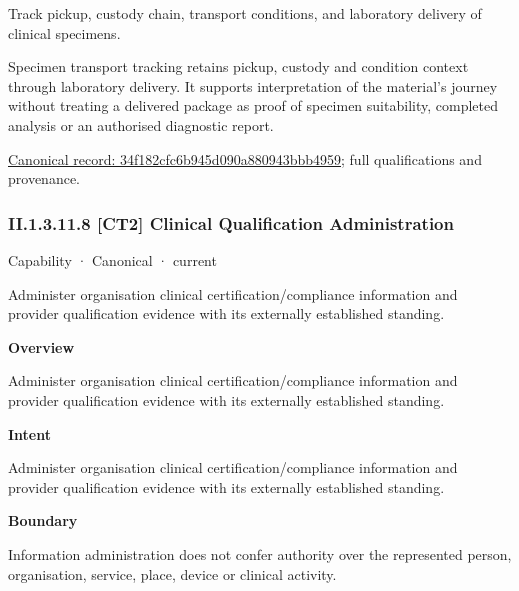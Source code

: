 Track pickup, custody chain, transport conditions, and laboratory delivery of clinical specimens.



Specimen transport tracking retains pickup, custody and condition context through laboratory delivery. It supports interpretation of the material's journey without treating a delivered package as proof of specimen suitability, completed analysis or an authorised diagnostic report.


{\footnotesize \href{../../../../continuum/strategy/capability/feature/34f182cfc6b945d090a880943bbb4959.md}{Canonical record: 34f182cfc6b945d090a880943bbb4959}; full qualifications and provenance.}\par
\subsubsection*{II.1.3.11.8 [CT2] Clinical Qualification Administration}
\label{navigation:II.1.3.11.8}

\label{element:0511a705d74a4f48a0ce92590ae764fa}
{\small Capability · Canonical · current}\par

Administer organisation clinical certification/compliance information and provider qualification evidence with its externally established standing.



\textbf{Overview}



Administer organisation clinical certification/compliance information and provider qualification evidence with its externally established standing.



\textbf{Intent}



Administer organisation clinical certification/compliance information and provider qualification evidence with its externally established standing.



\textbf{Boundary}



Information administration does not confer authority over the represented person, organisation, service, place, device or clinical activity.



